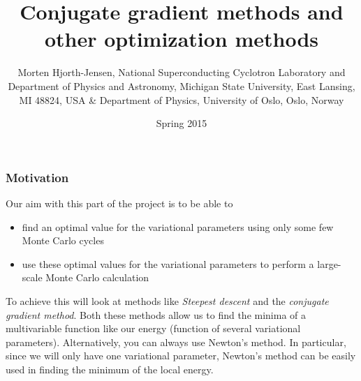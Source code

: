 \documentclass{beamer}
\begin{document}







\title{Conjugate gradient methods and other optimization methods}


\author{Morten Hjorth-Jensen, National Superconducting Cyclotron Laboratory and Department of Physics and Astronomy, Michigan State University, East Lansing, MI 48824, USA {\&} Department of Physics, University of Oslo, Oslo, Norway\inst{}}
\institute{}

\date{Spring 2015
}

\begin{frame}
\titlepage
\end{frame}

\begin{frame}
\frametitle{Motivation}

\begin{block}{}
Our aim with this part of the project is to be able to
\begin{itemize}
\item find an optimal value for the variational parameters using only some few Monte Carlo cycles

\item use these optimal values for the variational parameters to perform a large-scale Monte Carlo calculation
\end{itemize}

\noindent
To achieve this will look at methods like \emph{Steepest descent} and the \emph{conjugate gradient method}. Both these methods allow us to find
the minima of a multivariable  function like our energy (function of several variational parameters). 
Alternatively, you can always use Newton's method. In particular, since we will only have one variational parameter,
Newton's method can be easily used in finding the minimum of the local energy.

\end{block}
\end{frame}
\end{document}

